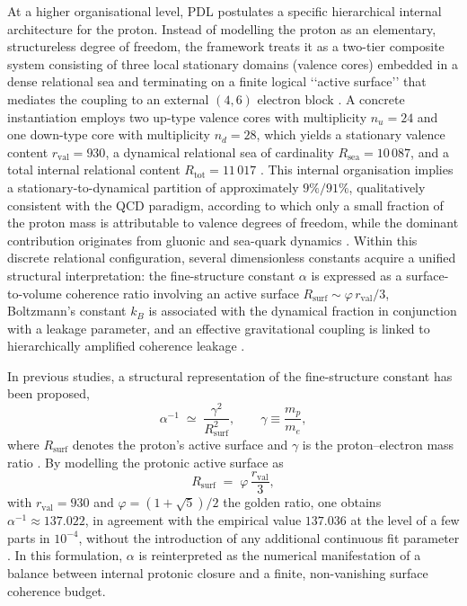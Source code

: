 \documentclass[11pt,a4paper]{article}
\numberwithin{equation}{section}
\begin{document}
At a higher organisational level, PDL postulates a specific hierarchical internal architecture for the proton. Instead of modelling the proton as an elementary, structureless degree of freedom, the framework treats it as a two-tier composite system consisting of three local stationary domains (valence cores) embedded in a dense relational sea and terminating on a finite logical ‘‘active surface’’ that mediates the coupling to an external $(4,6)$ electron block \cite{LaubscherIntroPDL2026,LaubscherPDLFull2026,LaubscherLDP2026}. A concrete instantiation employs two up-type valence cores with multiplicity $n_u=24$ and one down-type core with multiplicity $n_d=28$, which yields a stationary valence content $r_{\mathrm{val}}=930$, a dynamical relational sea of cardinality $R_{\mathrm{sea}}=10\,087$, and a total internal relational content $R_{\mathrm{tot}}=11\,017$ \cite{LaubscherPDLFull2026,LaubscherLDP2026,LaubscherCombinatorialProton2026}. This internal organisation implies a stationary-to-dynamical partition of approximately $9\%/91\%$, qualitatively consistent with the QCD paradigm, according to which only a small fraction of the proton mass is attributable to valence degrees of freedom, while the dominant contribution originates from gluonic and sea-quark dynamics \cite{LaubscherIMRadPDL2026, AmslerQCDProton}. Within this discrete relational configuration, several dimensionless constants acquire a unified structural interpretation: the fine-structure constant $\alpha$ is expressed as a surface-to-volume coherence ratio involving an active surface $R_{\mathrm{surf}}\sim \varphi\,r_{\mathrm{val}}/3$, Boltzmann’s constant $k_B$ is associated with the dynamical fraction in conjunction with a leakage parameter, and an effective gravitational coupling is linked to hierarchically amplified coherence leakage \cite{LaubscherPDLFull2026,LaubscherLDP2026,LaubscherDerivationAlpha2026,LaubscherExponent18PDL2026}.

In previous studies, a structural representation of the fine-structure constant has been proposed,
\begin{equation}
  \alpha^{-1} \;\simeq\; \frac{\gamma^2}{R_{\mathrm{surf}}^2},
  \qquad
  \gamma \equiv \frac{m_p}{m_e},
\end{equation}
where $R_{\mathrm{surf}}$ denotes the proton’s active surface and $\gamma$ is the proton–electron mass ratio \cite{LaubscherDerivationAlpha2026}. By modelling the protonic active surface as
\begin{equation}
  R_{\mathrm{surf}} \;=\; \varphi\,\frac{r_{\mathrm{val}}}{3},
\end{equation}
with $r_{\mathrm{val}}=930$ and $\varphi=(1+\sqrt{5})/2$ the golden ratio, one obtains $\alpha^{-1}\approx 137.022$, in agreement with the empirical value $137.036$ at the level of a few parts in $10^{-4}$, without the introduction of any additional continuous fit parameter \cite{LaubscherDerivationAlpha2026,LaubscherGoldenRatioPDL2026}. In this formulation, $\alpha$ is reinterpreted as the numerical manifestation of a balance between internal protonic closure and a finite, non-vanishing surface coherence budget.
\end{document}
